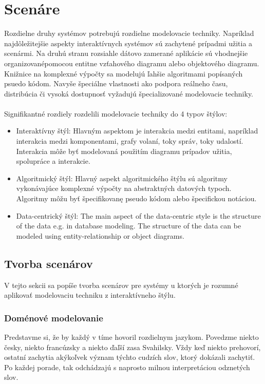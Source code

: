 \section{Scenáre}
 Rozdielne druhy systémov potrebujú rozdielne modelovacie techniky. Napríklad najdôležitejšie aspekty interaktívnych systémov sú zachytené prípadmi užitia a scenármi. Na druhú stranu rozsiahle dátovo zamerané aplikácie sú vhodnejšie organizovanépomocou entitne vzťahového diagramu alebo objektového diagramu. Knižnice na komplexné výpočty sa modelujú ľahšie algoritmami popísaných psuedo kódom. Navyše špeciálne vlastnosti ako podpora reálneho času, distribúcia či vysoká dostupnosť vyžadujú špecializované modelovacie techniky. \\\\
 Signifikantné rozdiely rozdelili modelovacie techniky do 4 typov štýlov:
 
 \begin{itemize}
 	\item Interaktívny štýl: Hlavným aspektom je interakcia medzi entitami, napríklad interakcia medzi komponentami, grafy volaní, toky správ, toky udalostí. Interakcia môže byť modelovaná použitím diagramu prípadov užitia, spolupráce a interakcie.
 	\item Algoritmický štýl: Hlavný aspekt algoritmického štýlu sú algoritmy vykonávajúce komplexné výpočty na abstraktných datových typoch. Algoritmy môžu byť špecifikovanę pseudo kódom alebo špecifickou notáciou.
 	\item Data-centrický štýl: The main aspect of the data-centric style is the structure of the data e.g.
 	in database modeling. The structure of the data can be modeled using entity-relationship or
 	object diagrams.
 \end{itemize}

\subsection{Tvorba scenárov}
V tejto sekcii sa popíše tvorba scenárov pre systémy u ktorých je rozumné aplikovať modelovaciu techniku z interaktívneho štýlu.

\subsubsection{Doménové modelovanie}
Predstavme si, že by každý v tíme hovoril rozdielnym jazykom. Povedzme niekto česky, niekto francúzsky a niekto ďaľší zasa Svahilsky. Vždy keď niekto prehovorí, ostatní zachytia akýkoľvek význam týchto cudzích slov, ktorý dokázali zachytiť. Po každej porade, tak odchádzajú s naprosto milnou interpretáciou odznetých slov.


